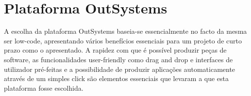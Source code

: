 \section{Plataforma OutSystems}\label{sec:plataformaOutSystems}

A escolha da plataforma OutSystems baseia-se essencialmente no facto da mesma ser low-code,
apresentando vários benefícios essenciais para um projeto de curto prazo como o apresentado. A rapidez
com que é possível produzir peças de software, as funcionalidades user-friendly como drag and drop e 
interfaces de utilizador pré-feitas e a possibilidade de produzir aplicações automaticamente através de
um simples click são elementos essenciais que levaram a que esta plataforma fosse escolhida.